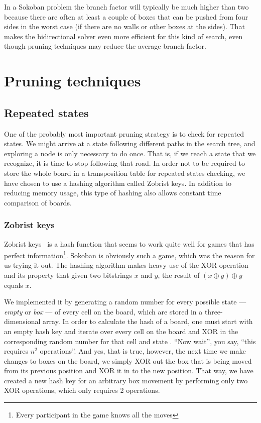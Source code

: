 \documentclass[a4paper,12pt]{article}
\renewcommand{\*}[0]{\cdot}
\begin{document}
In a Sokoban problem the branch factor will typically be much higher than two
because there are often at least a couple of boxes that can be pushed from four
sides in the worst case (if there are no walls or other boxes at the sides).
That makes the bidirectional solver even more efficient for this kind of
search, even though pruning techniques may reduce the average branch factor.



\section{Pruning techniques}

\subsection{Repeated states}

One of the probably most important pruning strategy is to check for repeated
states. We might arrive at a state following different paths in the search tree,
and exploring a node is only necessary to do once. That is, if we reach a state
that we recognize, it is time to stop following that road. In order not to be
required to store the whole board in a transposition table for repeated states
checking, we have chosen to use a hashing algorithm called Zobrist keys. In
addition to reducing memory usage, this type of hashing also allows constant
time comparison of boards.


\subsubsection{Zobrist keys}

Zobrist keys~\cite{wiki:zobrist} is a hash function that seems to work quite well for games that has
perfect information\footnote{Every participant in the game knows all the moves}.
Sokoban is obviously such a game, which was the reason for us trying it out. The
hashing algorithm makes heavy use of the XOR operation and its property that
given two bitstrings $x$ and $y$, the result of $(x \oplus y) \oplus y$ equals
$x$.

We implemented it by generating a random number for every possible state ---
\emph{empty} or \emph{box} --- of every cell on the board, which are stored in a
three-dimensional array. In order to calculate the hash of a board, one must
start with an empty hash key and iterate over every cell on the board and
XOR in the corresponding random number for that cell and state . ``Now wait'',
you say, ``this requires $n^2$ operations''. And yes, that is true, however, the
next time we make changes to boxes on the board, we simply XOR out the box that
is being moved from its previous position and XOR it in to the new position.
That way, we have created a new hash key for an arbitrary box movement by
performing only two XOR operations, which only requires 2 operations.
\end{document}
